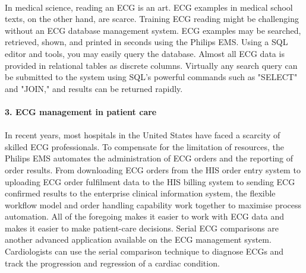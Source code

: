 \documentclass[12pt]{article}
\begin{document}
\paragraph{}In medical science, reading an ECG is an art. ECG examples in medical school texts, on the other hand, are scarce. Training ECG reading might be challenging without an ECG database management system. ECG examples may be searched, retrieved, shown, and printed in seconds using the Philips EMS. Using a SQL editor and tools, you may easily query the database. Almost all ECG data is provided in relational tables as discrete columns. Virtually any search query can be submitted to the system using SQL's powerful commands such as "SELECT" and "JOIN," and results can be returned rapidly.
\paragraph{\textbf{3. ECG management in patient care}}
\paragraph{}In recent years, most hospitals in the United States have faced a scarcity of skilled ECG professionals. To compensate for the limitation of resources, the Philips EMS automates the administration of ECG orders and the reporting of order results. From downloading ECG orders from the HIS order entry system to uploading ECG order fulfilment data to the HIS billing system to sending ECG confirmed results to the enterprise clinical information system, the flexible workflow model and order handling capability work together to maximise process automation. All of the foregoing makes it easier to work with ECG data and makes it easier to make patient-care decisions. Serial ECG comparisons are another advanced application available on the ECG management system. Cardiologists can use the serial comparison technique to diagnose ECGs and track the progression and regression of a cardiac condition.
\end{document}
